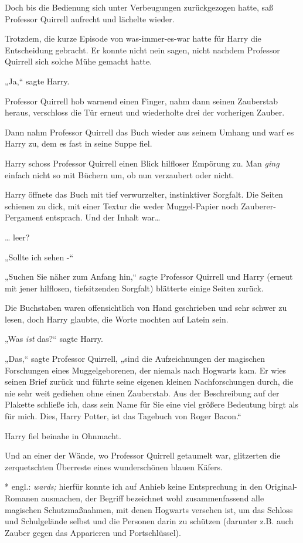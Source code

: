 {Doch bis die Bedienung sich unter Verbeugungen zurückgezogen hatte, saß Professor Quirrell aufrecht und lächelte wieder.

Trotzdem, die kurze Episode von was-immer-es-war hatte für Harry die Entscheidung gebracht. Er konnte nicht nein sagen, nicht nachdem Professor Quirrell sich solche Mühe gemacht hatte.

„Ja,“ sagte Harry.

Professor Quirrell hob warnend einen Finger, nahm dann seinen Zauberstab heraus, verschloss die Tür erneut und wiederholte drei der vorherigen Zauber.

Dann nahm Professor Quirrell das Buch wieder aus seinem Umhang und warf es Harry zu, dem es fast in seine Suppe fiel.

Harry schoss Professor Quirrell einen Blick hilfloser Empörung zu. Man \emph{ging} einfach nicht so mit Büchern um, ob nun verzaubert oder nicht.

Harry öffnete das Buch mit tief verwurzelter, instinktiver Sorgfalt. Die Seiten schienen zu dick, mit einer Textur die weder Muggel-Papier noch Zauberer-Pergament entsprach. Und der Inhalt war…

… leer?

„Sollte ich sehen -“

„Suchen Sie näher zum Anfang hin,“ sagte Professor Quirrell und Harry (erneut mit jener hilflosen, tiefsitzenden Sorgfalt) blätterte einige Seiten zurück.

Die Buchstaben waren offensichtlich von Hand geschrieben und sehr schwer zu lesen, doch Harry glaubte, die Worte mochten auf Latein sein.

„Was \emph{ist} das?“ sagte Harry.

„Das,“ sagte Professor Quirrell, „sind die Aufzeichnungen der magischen Forschungen eines Muggelgeborenen, der niemals nach Hogwarts kam. Er wies seinen Brief zurück und führte seine eigenen kleinen Nachforschungen durch, die nie sehr weit gediehen ohne einen Zauberstab. Aus der Beschreibung auf der Plakette schließe ich, dass sein Name für Sie eine viel größere Bedeutung birgt als für mich. Dies, Harry Potter, ist das Tagebuch von Roger Bacon.“

Harry fiel beinahe in Ohnmacht.

Und an einer der Wände, wo Professor Quirrell getaumelt war, glitzerten die zerquetschten Überreste eines wunderschönen blauen Käfers.

* engl.: \emph{wards;} hierfür konnte ich auf Anhieb keine Entsprechung in den Original-Romanen ausmachen, der Begriff bezeichnet wohl zusammenfassend alle magischen Schutzmaßnahmen, mit denen Hogwarts versehen ist, um das Schloss und Schulgelände selbst und die Personen darin zu schützen (darunter z.B. auch Zauber gegen das Apparieren und Portschlüssel).

}
